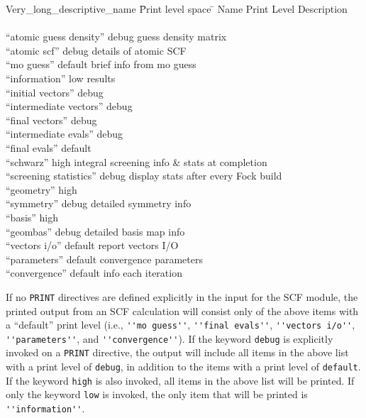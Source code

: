 \begin{tabbing}
  Very\_long\_descriptive\_name \= Print level space \= \kill
  Name                    \> Print Level \> Description \\
                          \>        \> \\
 ``atomic guess density'' \> debug  \> guess density matrix \\
 ``atomic scf''           \> debug  \> details of atomic SCF \\
 ``mo guess''             \> default\> brief info from mo guess \\
 ``information''          \> low    \> results  \\
 ``initial vectors''      \> debug  \> \\
 ``intermediate vectors'' \> debug  \> \\
 ``final vectors''        \> debug  \> \\
 ``intermediate evals''   \> debug  \> \\
 ``final evals''          \> default\> \\
 ``schwarz''              \> high   \> integral screening info \&
  stats at completion\\
 ``screening statistics'' \> debug  \> display stats after every Fock build \\
 ``geometry''             \> high   \> \\
 ``symmetry''             \> debug  \> detailed symmetry info \\
 ``basis''                \> high   \> \\
 ``geombas''              \> debug  \> detailed basis map info \\
 ``vectors i/o''          \> default\> report vectors I/O \\
 ``parameters''           \> default\> convergence parameters \\
 ``convergence''          \> default\> info each iteration
\end{tabbing}

If no \verb+PRINT+ directives are defined explicitly in the input for
the SCF module, the printed output from an SCF calculation will
consist only of the above items with a ``default'' print level (i.e.,
\verb+''mo guess''+, \verb+''final evals''+, \verb+''vectors i/o''+,
\verb+''parameters''+, and \verb+''convergence''+).  If the keyword
\verb+debug+ is explicitly invoked on a \verb+PRINT+ directive, the
output will include all items in the above list with a print level of
\verb+debug+, in addition to the items with a print level of
\verb+default+.  If the keyword \verb+high+ is also invoked, all items
in the above list will be printed.  If only the keyword \verb+low+ is
invoked, the only item that will be printed is \verb+''information''+.



